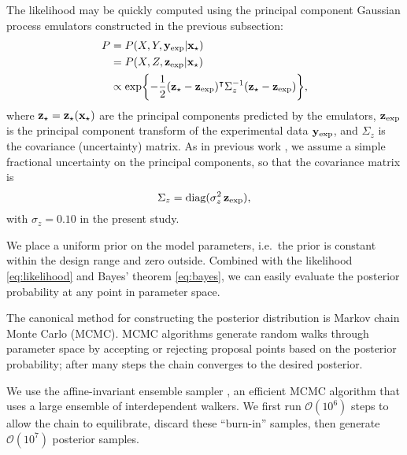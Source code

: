 \documentclass[aps,prc,reprint,amsmath,nofootinbib,superscriptaddress]{revtex4-1}
\newcommand{\order}[1]{$\mathcal O(10^{#1})$}
\begin{document}
The likelihood may be quickly computed using the principal component Gaussian process emulators constructed in the previous subsection:
\begin{align}
  P &= P(X,Y,\mathbf y_\text{exp}|\mathbf x_\star) \nonumber \\
    &= P(X,Z,\mathbf z_\text{exp}|\mathbf x_\star) \nonumber \\
    &\propto\exp\biggl\{
      -\frac{1}{2} (\mathbf z_\star - \mathbf z_\text{exp})^\intercal \Sigma_z^{-1} (\mathbf z_\star - \mathbf z_\text{exp})
    \biggr\},
  \label{eq:likelihood}
\end{align}
where $\mathbf z_\star = \mathbf z_\star(\mathbf x_\star)$ are the principal components predicted by the emulators, $\mathbf z_\text{exp}$ is the principal component transform of the experimental data $\mathbf y_\text{exp}$, and $\Sigma_z$ is the covariance (uncertainty) matrix.
As in previous work \cite{Novak:2013bqa,Bernhard:2015hxa}, we assume a simple fractional uncertainty on the principal components, so that the covariance matrix is
\begin{equation}
  \Sigma_z = \text{diag}(\sigma^2_z\,\mathbf z_\text{exp}),
\end{equation}
with $\sigma_z = 0.10$ in the present study.

We place a uniform prior on the model parameters, i.e.\ the prior is constant within the design range and zero outside.
Combined with the likelihood \eqref{eq:likelihood} and Bayes' theorem \eqref{eq:bayes}, we can easily evaluate the posterior probability at any point in parameter space.

The canonical method for constructing the posterior distribution is Markov chain Monte Carlo (MCMC).
MCMC algorithms generate random walks through parameter space by accepting or rejecting proposal points based on the posterior probability; after many steps the chain converges to the desired posterior.

We use the affine-invariant ensemble sampler \cite{Goodman:2010en,FM:2013mc}, an efficient MCMC algorithm that uses a large ensemble of interdependent walkers.
We first run \order 6 steps to allow the chain to equilibrate, discard these ``burn-in'' samples, then generate \order 7 posterior samples.


\end{document}
